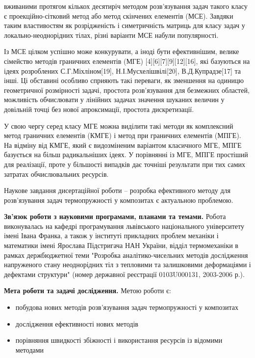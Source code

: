 { вживаними протягом кількох десятиріч методом розв'язування задач такого класу є проекційно-сітковий
метод або метод скінчених елементів (МСЕ). Завдяки таким властивостям як розрідженість і симетричність матриць для класу
задач у локально-неоднорідних тілах, різні варіанти МСЕ набули популярності.

Із МСЕ цілком успішно може конкурувати, а іноді бути ефективнішим, велике сімейство методів граничних елементів (МГЕ)
\cite{benerdge-et-al} {[}4{]}{[}6{]}{[}7{]}{[}9{]}{[}12{]}{[}16{]}, які базуються на ідеях розроблених
С.Г.Міхліном{[}19{]}, Н.І.Мусхелішвілі{[}20{]}, В.Д.Купрадзе{[}17{]} та інші. Ці обставині особливо сприяють такі
переваги, як зменшення на одиницю геометричної розмірності задачі, простота розв'язування для безмежних областей,
можливість обчислювати у лінійних задачах значення шуканих величин у довільній точці без нової апроксимації, простота
дискретизації.

У свою чергу серед класу МГЕ можна виділити такі методи як комплексний метод граничних елементів (КМГЕ) і метод при
граничних елементів (МПГЕ). На відміну від КМГЕ, який є видозміненим варіантом класичного МГЕ, МПГЕ базується на більш
радикальніших ідеях. У порівнянні із МГЕ, МПГЕ простіший для реалізації, проте у більшості випадків дає точніші
результати при тих самих затратах обчислювальних ресурсів.}

Наукове завдання дисертаційної роботи -- розробка ефективного методу для розв'язування задач термопружності у композитах
є актуальною проблемою.

\textbf{Зв'язок роботи з науковими програмами, планами та темами.} Робота виконувалась на кафедрі програмування
львівського національного університету імені Івана Франка, а також у інституті прикладних проблем механіки і математики
імені Ярослава Підстригача НАН України, відділ термомеханіки в рамках держбюджетної теми "Розробка аналітико-чисельних
методів дослідження напруженого стану неоднорідних тіл з тепловими та залишковими деформаціями і дефектами структури" 
(номер державної реєстрації 0103U000131, 2003-2006 р.).

\textbf{Мета роботи та задачі дослідження.} Метою роботи є:

\begin{itemize}
\item
  побудова нових методів розв'язування задач термопружності у композитах
\item
  дослідження ефективності нових методів
\item
  порівняння швидкості збіжності і використання ресурсів із відомими методами
\end{itemize}

